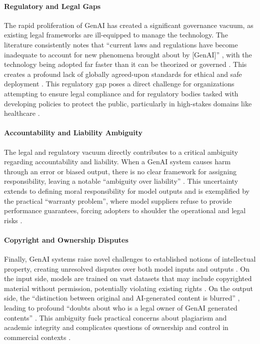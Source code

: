 \paragraph{Regulatory and Legal Gaps}
The rapid proliferation of GenAI has created a significant governance vacuum, as existing legal frameworks are ill-equipped to manage the technology. The literature consistently notes that \enquote{current laws and regulations have become inadequate to account for new phenomena brought about by [GenAI]} \parencite{R07}, with the technology being adopted far faster than it can be theorized or governed \parencite{S13}. This creates a profound lack of globally agreed-upon standards for ethical and safe deployment \parencite{R09}. This regulatory gap poses a direct challenge for organizations attempting to ensure legal compliance \parencite{S08} and for regulatory bodies tasked with developing policies to protect the public, particularly in high-stakes domains like healthcare \parencite{S16}.

\paragraph{Accountability and Liability Ambiguity}
The legal and regulatory vacuum directly contributes to a critical ambiguity regarding accountability and liability. When a GenAI system causes harm through an error or biased output, there is no clear framework for assigning responsibility, leaving a notable ``ambiguity over liability'' \parencite{S17}. This uncertainty extends to defining moral responsibility for model outputs \parencite{S09} and is exemplified by the practical ``warranty problem'', where model suppliers refuse to provide performance guarantees, forcing adopters to shoulder the operational and legal risks \parencite{R03}.

\paragraph{Copyright and Ownership Disputes}
Finally, GenAI systems raise novel challenges to established notions of intellectual property, creating unresolved disputes over both model inputs and outputs \parencite{R04, R08, R10, S10, S12, S14}. On the input side, models are trained on vast datasets that may include copyrighted material without permission, potentially violating existing rights \parencite{R04, S09}. On the output side, the \enquote{distinction between original and AI-generated content is blurred} \parencite{S09}, leading to profound \enquote{doubts about who is a legal owner of GenAI generated contents} \parencite{R04}. This ambiguity fuels practical concerns about plagiarism and academic integrity \parencite{S10,S12} and complicates questions of ownership and control in commercial contexts \parencite{S09}.

